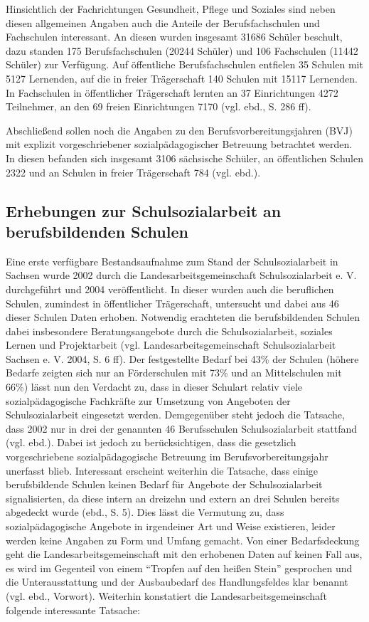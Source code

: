 {Hinsichtlich der Fachrichtungen Gesundheit, Pflege und Soziales sind neben diesen allgemeinen Angaben auch die Anteile der Berufsfachschulen und Fachschulen interessant. An diesen wurden insgesamt 31686 Schüler beschult, dazu standen 175 Berufsfachschulen (20244 Schüler) und 106 Fachschulen (11442 Schüler) zur Verfügung. Auf öffentliche Berufsfachschulen entfielen 35 Schulen mit 5127 Lernenden, auf die in freier Trägerschaft 140 Schulen mit 15117 Lernenden. In Fachschulen in öffentlicher Trägerschaft lernten an 37 Einrichtungen 4272 Teilnehmer, an den 69 freien Einrichtungen 7170 (vgl. ebd., S. 286 ff). 

Abschließend sollen noch die Angaben zu den Berufsvorbereitungsjahren (BVJ) mit explizit vorgeschriebener sozialpädagogischer Betreuung betrachtet werden. In diesen befanden sich insgesamt 3106 sächsische Schüler, an öffentlichen Schulen 2322 und an Schulen in freier Trägerschaft 784 (vgl. ebd.). 

\subsection{Erhebungen zur Schulsozialarbeit an berufsbildenden Schulen}
\label{sec:ErhebungenZurSchulsozialarbeitAnBerufsbildendenSchulen}

Eine erste verfügbare Bestandsaufnahme zum Stand der Schulsozialarbeit in Sachsen wurde 2002 durch die Landesarbeitsgemeinschaft Schulsozialarbeit e. V. durchgeführt und 2004 veröffentlicht. In dieser wurden auch die beruflichen Schulen, zumindest in öffentlicher Trägerschaft, untersucht und dabei aus 46 dieser Schulen Daten erhoben. Notwendig erachteten die berufsbildenden Schulen dabei insbesondere Beratungsangebote durch die Schulsozialarbeit, soziales Lernen und Projektarbeit (vgl. Landesarbeitsgemeinschaft Schulsozialarbeit Sachsen e. V. 2004, S. 6 ff). Der festgestellte Bedarf bei 43\% der Schulen (höhere Bedarfe zeigten sich nur an Förderschulen mit 73\% und an Mittelschulen mit 66\%) lässt nun den Verdacht zu, dass in dieser Schulart relativ viele sozialpädagogische Fachkräfte zur Umsetzung von Angeboten der Schulsozialarbeit eingesetzt werden. Demgegenüber steht jedoch die Tatsache, dass 2002 nur in drei der genannten 46 Berufsschulen Schulsozialarbeit stattfand (vgl. ebd.). Dabei ist jedoch zu berücksichtigen, dass die gesetzlich vorgeschriebene sozialpädagogische Betreuung im Berufsvorbereitungsjahr unerfasst blieb. Interessant erscheint weiterhin die Tatsache, dass einige berufsbildende Schulen keinen Bedarf für Angebote der Schulsozialarbeit signalisierten, da diese intern an dreizehn und extern an drei Schulen bereits abgedeckt wurde (ebd., S. 5). Dies lässt die Vermutung zu, dass sozialpädagogische Angebote in irgendeiner Art und Weise existieren, leider werden keine Angaben zu Form und Umfang gemacht. Von einer Bedarfsdeckung geht die Landesarbeitsgemeinschaft mit den erhobenen Daten auf keinen Fall aus, es wird im Gegenteil von einem "`Tropfen auf den heißen Stein"' gesprochen und die Unterausstattung und der Ausbaubedarf des Handlungsfeldes klar benannt (vgl. ebd., Vorwort). Weiterhin konstatiert die Landesarbeitsgemeinschaft folgende interessante Tatsache: 

}
